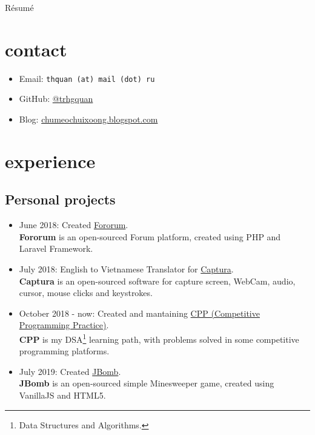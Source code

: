\documentclass{article}
\renewcommand{\maketitle}{
\begin{center}
{\huge\bfseries\theauthor}
\linebreak\linebreak
R\'esum\'e
\end{center}
}
\begin{document}
\author{Quan, Tran Hoang}
\maketitle

\section{contact}
\begin{itemize}
\item Email: \texttt{thquan (at) mail (dot) ru}
\item GitHub: \href{https://github.com/trhgquan}{@trhgquan}
\item Blog: \href{https://chumeochuixoong.blogspot.com}{chumeochuixoong.blogspot.com}
\end{itemize}

\section{experience}
\subsection{Personal projects}
\begin{itemize}
\item June 2018: Created \href{https://github.com/trhgquan/Fororum}{Fororum}.\\
\textbf{Fororum} is an open-sourced Forum platform, created using PHP and Laravel Framework.

\item July 2018: English to Vietnamese Translator for \href{https://github.com/MathewSachin/Captura}{Captura}.\\
\textbf{Captura} is an open-sourced software for capture screen, WebCam, audio, cursor, mouse clicks and keystrokes.

\item October 2018 - now: Created and mantaining \href{https://github.com/trhgquan/CPP}{CPP (Competitive Programming Practice)}.\\
\textbf{CPP} is my DSA\footnote{Data Structures and Algorithms.} learning path, with problems solved in some competitive programming platforms.

\item July 2019: Created \href{https://github.com/trhgquan/JBomb}{JBomb}.\\
\textbf{JBomb} is an open-sourced simple Minesweeper game, created using VanillaJS and HTML5.
\end{itemize}
\end{document}
